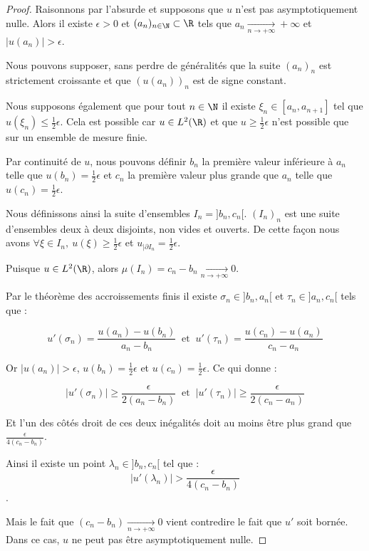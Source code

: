 \begin{proof}

    \vspace{1em}

    Raisonnons par l'absurde et supposons que $u$ n'est pas asymptotiquement nulle.
    Alors il existe $\epsilon > 0$ et $(a_n)_{n \in \N} \subset \R$ tels que $a_n \xrightarrow[n \to +\infty]{} + \infty$ et $|u(a_n)|>\epsilon$.

    Nous pouvons supposer, sans perdre de généralités que la suite $(a_n)_n$ est strictement croissante et que $(u(a_n))_n$ est de signe constant.

    Nous supposons également que pour tout $n \in \N$ il existe $\xi_n \in [a_n,a_{n+1}]$ tel que $u(\xi_n) \leq \frac{1}{2}\epsilon$.
    Cela est possible car $u \in L^2(\R)$ et que $u \geq \frac{1}{2}\epsilon$ n'est possible que sur un ensemble de mesure finie.

    \vspace{1em}
    Par continuité de $u$, nous pouvons définir $b_n$ la première valeur inférieure à $a_n$ telle que $u(b_n) = \frac{1}{2}\epsilon$ et
    $c_n$ la première valeur plus grande que $a_n$ telle que $u(c_n) = \frac{1}{2}\epsilon$. 
    
    Nous définissons ainsi la suite d'ensembles $I_n = ]b_n,c_n[$.
    $(I_n)_n$ est une suite d'ensembles deux à deux disjoints, non vides et ouverts. De cette façon nous avons $\forall \xi \in I_n, \ u(\xi) \geq \frac{1}{2}\epsilon$ et $u_{|\partial I_n} = \frac{1}{2}\epsilon$.
    
    Puisque $u \in L^2(\R)$, alors $\mu(I_n) = c_n - b_n \xrightarrow[n \to +\infty]{}0$.

    \vspace{1em}
    Par le théorème des accroissements finis il existe $\sigma_n \in ]b_n,a_n[$ et $\tau_n \in ]a_n, c_n[$ tels que :

    $$ u'(\sigma_n) = \frac{u(a_n) - u(b_n)}{a_n - b_n} \ \text{ et } \ u'(\tau_n) = \frac{u(c_n) - u(a_n)}{c_n - a_n} $$

    Or $|u(a_n)|>\epsilon$, $u(b_n) = \frac{1}{2}\epsilon$ et $u(c_n) = \frac{1}{2}\epsilon$.
    Ce qui donne :

    $$|u'(\sigma_n)| \geq \frac{\epsilon}{2(a_n - b_n)} \ \text{ et } \ |u'(\tau_n)| \geq \frac{\epsilon}{2(c_n - a_n)} $$
    
    Et l'un des côtés droit de ces deux inégalités doit au moins être plus grand que $\frac{\epsilon}{4(c_n - b_n)}$.

    Ainsi il existe un point $\lambda_n \in ]b_n,c_n[$ tel que :
    $$|u'(\lambda_n)| > \frac{\epsilon}{4(c_n - b_n)}$$.

    Mais le fait que $(c_n - b_n) \xrightarrow[n \to +\infty]{}0$ vient contredire le fait que $u'$ soit bornée.
    Dans ce cas, $u$ ne peut pas être asymptotiquement nulle.

\end{proof}

